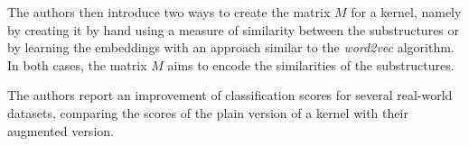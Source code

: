 The authors then introduce two ways to create the matrix $M$ for a kernel, namely by creating it by hand using a measure of similarity between the substructures or by learning the embeddings with an approach similar to the \textit{word2vec} algorithm.
In both cases, the matrix $M$ aims to encode the similarities of the substructures.

The authors report an improvement of classification scores for several real-world datasets, comparing the scores of the plain version of a kernel with their augmented version.


